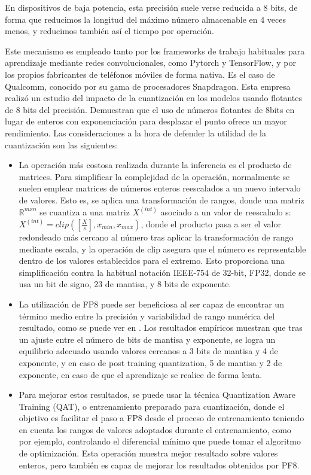 En dispositivos de baja potencia, esta precisión suele verse reducida a 8 bits, de forma que reducimos la longitud del máximo número almacenable en 4 veces menos, y reducimos también así el tiempo por operación.

Este mecanismo es empleado tanto por los frameworks de trabajo habituales para aprendizaje mediante redes convolucionales, como Pytorch y TensorFlow, y por los propios fabricantes de teléfonos móviles de forma nativa. Es el caso de Qualcomm, conocido por su gama de procesadores Snapdragon. Esta empresa realizó un estudio del impacto de la cuantización en los modelos \cite{kuzmin2024fp8} usando flotantes de 8 bits del precisión. Demuestran que el uso de números flotantes de 8bits en lugar de enteros con exponenciación para desplazar el punto ofrece un mayor rendimiento. Las consideraciones a la hora de defender la utilidad de la cuantización son las siguientes:

\begin{itemize}
	\item La operación más costosa realizada durante la inferencia es el producto de matrices. Para simplificar la complejidad de la operación, normalmente se suelen emplear matrices de números enteros reescalados a un nuevo intervalo de valores. Esto es, se aplica una transformación de rangos, donde una matriz $\mathbb{R}^{m x n}$ se cuantiza a una matriz $X^{(int)}$ asociado a un valor de reescalado s: $X^{(int)}=clip([\frac{X}{s}],x_{min},x_{max})$, donde el producto pasa a ser el valor redondeado más cercano al número tras aplicar la transformación de rango mediante escala, y la operación de clip asegura que el número es representable dentro de los valores establecidos para el extremo. Esto proporciona una simplificación contra la habitual notación IEEE-754 de 32-bit, FP32, donde se usa un bit de signo, 23
	de mantisa, y 8 bits de exponente.
	\item  La utilización de FP8 puede ser beneficiosa al ser capaz de encontrar un término medio entre la precisión y variabilidad de rango numérica del resultado, como se puede ver en \cite{kuzmin2024fp8}. Los resultados empíricos muestran que tras un ajuste entre el número de bits de mantisa y exponente, se logra un equilibrio adecuado usando valores cercanos a 3 bits de mantisa y 4 de exponente, y en caso de post training quantization, 5 de mantisa y 2 de exponente, en caso de que el aprendizaje se realice de forma lenta.
	\item Para mejorar estos resultados, se puede usar la técnica Quantization Aware Training (QAT), o entrenamiento preparado para cuantización, donde el objetivo es facilitar el paso a FP8 desde el proceso de entrenamiento teniendo en cuenta los rangos de valores adoptados durante el entrenamiento, como por ejemplo, controlando el diferencial mínimo que puede tomar el algoritmo de optimización. Esta operación muestra mejor resultado sobre valores enteros, pero también es capaz de mejorar los resultados obtenidos por PF8.
\end{itemize}

